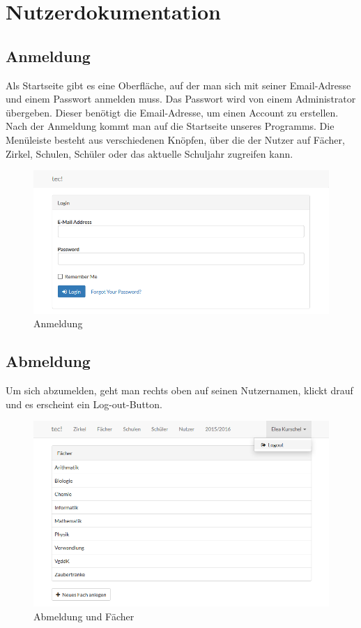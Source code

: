 \section{Nutzerdokumentation}
\subsection{Anmeldung}
Als Startseite gibt es eine Oberfläche, auf der man sich mit seiner Email-Adresse und einem Passwort anmelden muss. Das Passwort wird von einem Administrator übergeben. Dieser benötigt die Email-Adresse, um einen Account zu erstellen. Nach der Anmeldung kommt man auf die Startseite unseres Programms. Die Menüleiste besteht aus verschiedenen Knöpfen, über die der Nutzer auf Fächer, Zirkel, Schulen, Schüler oder das aktuelle Schuljahr zugreifen kann.

\begin{figure}[ht]
	\centering
	\includegraphics[scale=.48]{bilder/Anmeldung.png}
	\caption{Anmeldung}
\end{figure}

\subsection{Abmeldung}
Um sich abzumelden, geht man rechts oben auf seinen Nutzernamen, klickt drauf und es erscheint ein Log-out-Button.

\begin{figure}[ht]
	\centering
	\includegraphics[scale=.48]{bilder/Abmeldung_Faecher.png}
	\caption{Abmeldung und Fächer}
\end{figure}


